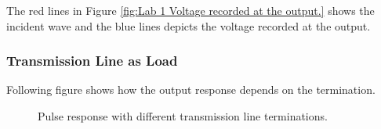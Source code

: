 \documentclass[report.tex]{subfiles}
\begin{document}
The red lines in Figure \ref{fig:Lab 1 Voltage recorded at the output.} shows the incident wave and the blue lines depicts the voltage recorded at the output.

\subsubsection{Transmission Line as Load}
Following figure shows how the output response depends on the termination.

\begin{figure}[H]
	\centering
	\caption{Pulse response with different transmission line terminations.}
	\label{fig:Lab 1 Pulse responses.}
\end{figure}
\end{document}
